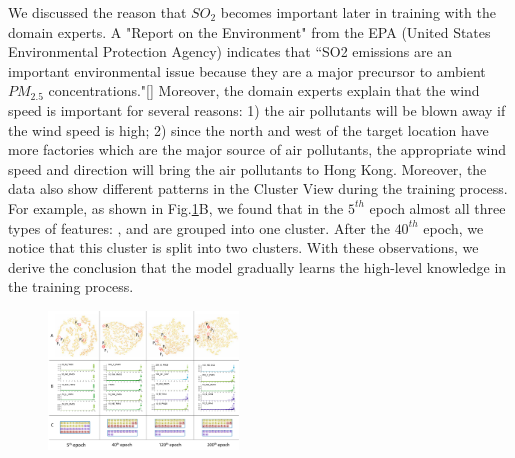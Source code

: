 We discussed the reason that $SO_2$ becomes important later in training with the domain experts. 
A "Report on the Environment" from the EPA (United States Environmental Protection Agency) indicates that ``SO2 emissions are an important environmental issue because they are a major precursor to ambient $PM_{2.5}$ concentrations."\ref{}
Moreover, the domain experts explain that the wind speed is important for several reasons: 1) the air pollutants will  be blown away if the wind speed is high; 2) since the north and west of the target location have more factories which are the major source of air pollutants, the appropriate wind speed and direction will bring the air pollutants to Hong Kong.
Moreover, the data also show different patterns in the Cluster View during the training process. 
For example, as shown in Fig.\ref{fig:evolution_epochs}B, we found that in the $5^{th}$ epoch almost all three types of features: \textit{\color{SLPColor}{Sealevel Pressure}}, \textit{\color{DPColor}{Dew-point}} and  \textit{\color{SPColor}{Station Pressure}} are grouped into one cluster. 
After the $40^{th}$ epoch, we notice that this cluster is split into two clusters.
With these observations, we derive the conclusion that the model gradually learns the high-level knowledge in the training process.

\begin{figure}[t]
	\centering
	\includegraphics[width=0.45\textwidth]{pictures/Evaluation/evolution_epochs.pdf}
	\vspace{-3mm}
	\caption{
	}
	\label{fig:evolution_epochs}
	\vspace{-4mm}
\end{figure}

